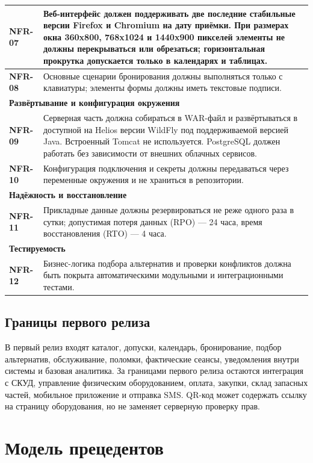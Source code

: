 \documentclass[12pt,a4paper]{article}
\newcommand{\req}[1]{\textbf{#1}}
\begin{document}
\begin{longtable}{|p{}|p{}|}
\hline
\req{NFR-07} & Веб-интерфейс должен поддерживать две последние стабильные
версии Firefox и Chromium на дату приёмки. При размерах окна 360x800, 768x1024
и 1440x900 пикселей элементы не должны перекрываться или обрезаться;
горизонтальная прокрутка допускается только в календарях и таблицах. \\
\hline
\req{NFR-08} & Основные сценарии бронирования должны выполняться только с
клавиатуры; элементы формы должны иметь текстовые подписи. \\
\hline
\multicolumn{2}{|l|}{\textbf{Развёртывание и конфигурация окружения}} \\
\hline
\req{NFR-09} & Серверная часть должна собираться в WAR-файл и
развёртываться в доступной на Helios версии WildFly под поддерживаемой версией
Java. Встроенный Tomcat не используется. PostgreSQL должен работать без
зависимости от внешних облачных сервисов. \\
\hline
\req{NFR-10} & Конфигурация подключения и секреты должны передаваться через
переменные окружения и не храниться в репозитории. \\
\hline
\multicolumn{2}{|l|}{\textbf{Надёжность и восстановление}} \\
\hline
\req{NFR-11} & Прикладные данные должны резервироваться не реже одного раза в
сутки; допустимая потеря данных (RPO) --- 24 часа, время восстановления (RTO)
--- 4 часа. \\
\hline
\multicolumn{2}{|l|}{\textbf{Тестируемость}} \\
\hline
\req{NFR-12} & Бизнес-логика подбора альтернатив и проверки конфликтов должна
быть покрыта автоматическими модульными и интеграционными тестами. \\
\hline
\end{longtable}
\endgroup

\subsection{Границы первого релиза}

В первый релиз входят каталог, допуски, календарь, бронирование, подбор
альтернатив, обслуживание, поломки, фактические сеансы, уведомления внутри
системы и базовая аналитика. За границами первого релиза остаются интеграция с
СКУД, управление физическим оборудованием, оплата, закупки, склад запасных
частей, мобильное приложение и отправка SMS. QR-код может содержать ссылку на
страницу оборудования, но не заменяет серверную проверку прав.

\section{Модель прецедентов}
\end{document}
